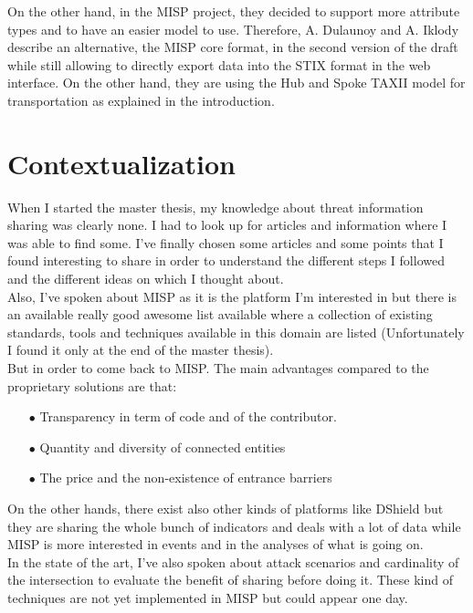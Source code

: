 \documentclass{eplmastersthesis}
\begin{document}
On the other hand, in the MISP project, they decided to support more attribute types and to have an easier model to use. Therefore, A. Dulaunoy and A. Iklody describe an alternative, the MISP core format, in the second version of the draft\cite{MispDraft} while still allowing to directly export data into the STIX format in the web interface. On the other hand, they are using the Hub and Spoke TAXII model for transportation as explained in the introduction.

\section{Contextualization}
When I started the master thesis, my knowledge about threat information sharing was clearly none. I had to look up for articles and information where I was able to find some. I've finally chosen some articles and some points that I found interesting to share in order to understand the different steps I followed and the different ideas on which I thought about.\\
Also, I've spoken about MISP as it is the platform I'm interested in but there is an available really good awesome list \cite{AwesomeTreat} available where a collection of existing standards, tools and techniques available in this domain are listed (Unfortunately I found it only at the end of the master thesis).\\
But in order to come back to MISP. The main advantages compared to the proprietary solutions are that:
\begin{itemize}
\item[$\bullet$] Transparency in term of code and of the contributor.
\item[$\bullet$] Quantity and diversity of connected entities
\item[$\bullet$] The price and the non-existence of entrance barriers
\end{itemize}

On the other hands, there exist also other kinds of platforms like DShield but they are sharing the whole bunch of indicators and deals with a lot of data while MISP is more interested in events and in the analyses of what is going on.\\

In the state of the art, I've also spoken about attack scenarios and cardinality of the intersection to evaluate the benefit of sharing before doing it. These kind of techniques are not yet implemented in MISP but could appear one day.\\
\end{document}
